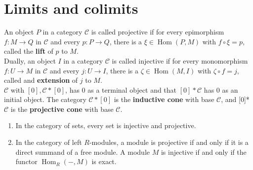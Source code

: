 





\section{Limits and colimits}

An object $P$ in a category $\mathcal{C}$ is called projective if for every epimorphism $f: M \rightarrow Q$ in $\mathcal{C}$ and every $p: P \rightarrow Q$, there is a $\xi \in \operatorname{Hom}(P, M)$ with $f \circ \xi=p$, called the \textbf{lift} of $p$ to $M$.\\
Dually, an object $I$ in a category $\mathcal{C}$ is called injective if for every monomorphism $f: U \rightarrow M$ in $\mathcal{C}$ and every $j: U \rightarrow I$, there is a $\zeta \in \operatorname{Hom}(M, I)$ with $\zeta \circ f=j$, called and \textbf{extension} of $j$ to $M$.\\
$\mathcal{C}$ with $[0], \mathcal{C} *[0]$, has 0 as a terminal object and that $[0] * \mathcal{C}$ has 0 as an initial object. The category $\mathcal{C} *[0]$ is the \textbf{inductive cone} with base $\mathcal{C}$, and [0]* $\mathcal{C}$ is the \textbf{projective cone} with base $\mathcal{C}$.


\begin{example}
    \begin{enumerate}
        \item In the category of sets, every set is injective and projective.
        \item In the category of left $R$-modules, a module is projective if and only if it is a direct summand of a free module. A module $M$ is injective if and only if the functor $\operatorname{Hom}_R(-, M)$ is exact.
    \end{enumerate}
\end{example}

